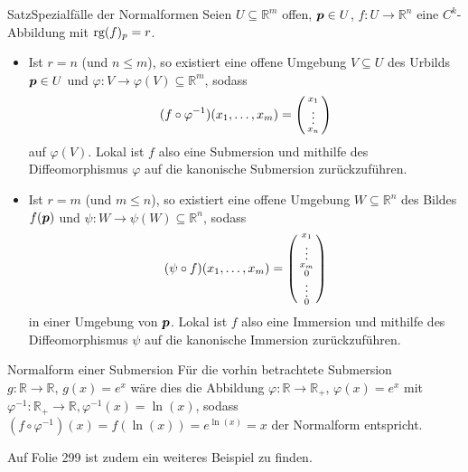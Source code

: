 \begin{Satz}
{Satz}{Spezialfälle der Normalformen}
Seien $U\subseteq \mathbb{R}^m$ offen, ${{\text{\boldmath${p}$}}}\in U$, $f:U\to\mathbb{R}^n$ eine $C^k$-Abbildung mit $\text{rg}(f)_p=r$.
\begin{itemize}
    \item Ist $r=n$ (und $n\leq m$), so existiert eine offene Umgebung $V\subseteq U$ des Urbilds ${{\text{\boldmath${p}$}}}\in U$ und $\varphi:V\to\varphi(V)\subseteq\mathbb{R}^m$, sodass
    \begin{equation*}
        (f\circ\varphi^{-1})(x_1,\ldots,x_m)=\left(\begin{smallmatrix}x_1\\\vdots\\x_n\end{smallmatrix}\right)
    \end{equation*}
    auf $\varphi(V)$. Lokal ist $f$ also eine Submersion und mithilfe des Diffeomorphismus $\varphi$ auf die kanonische Submersion zurückzuführen.
    \item Ist $r=m$ (und $m\leq n$), so existiert eine offene Umgebung $W\subseteq \mathbb{R}^n$ des Bildes $f({{\text{\boldmath${p}$}}})$ und $\psi:W\to\psi(W)\subseteq\mathbb{R}^n$, sodass
    \begin{equation*}
        (\psi\circ f)(x_1,\ldots,x_m)=\left(\begin{smallmatrix}x_1\\\vdots\\x_m\\0\\\vdots\\0\end{smallmatrix}\right)
    \end{equation*}
    in einer Umgebung von ${{\text{\boldmath${p}$}}}$. Lokal ist $f$ also eine Immersion und mithilfe des Diffeomorphismus $\psi$ auf die kanonische Immersion zurückzuführen.
\end{itemize}
\end{Satz}
\begin{Beispiel}
{Normalform einer Submersion}
Für die vorhin betrachtete Submersion $g:\mathbb{R}\to\mathbb{R},\,g(x)=e^x$ wäre dies die Abbildung $\varphi:\mathbb{R}\to\mathbb{R}_+,\,\varphi(x)=e^x$ mit $\varphi^{-1}:\mathbb{R}_+\to\mathbb{R},\varphi^{-1}(x)=\ln(x)$, sodass $(f\circ\varphi^{-1})(x)=f(\ln(x))=e^{\ln(x)}=x$ der Normalform entspricht.
\end{Beispiel}
Auf Folie 299 ist zudem ein weiteres Beispiel zu finden.


